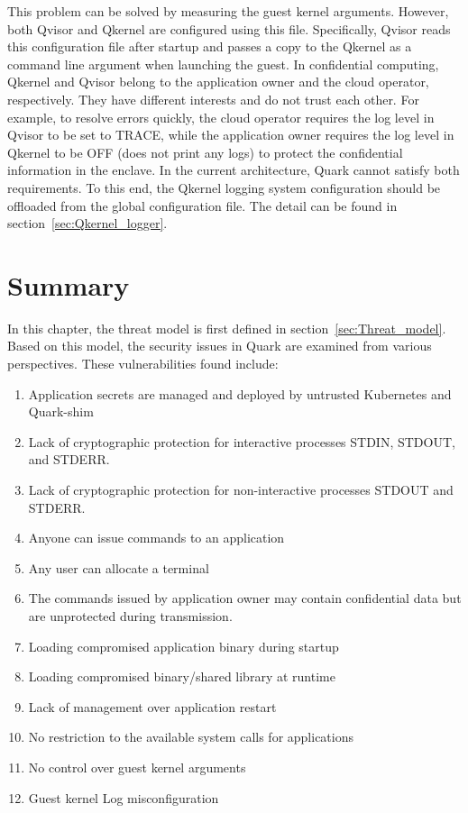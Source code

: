 This problem can be solved by measuring the guest kernel arguments. However, both Qvisor and Qkernel are configured using this file. Specifically, Qvisor reads this configuration file after startup and passes a copy to the Qkernel as a command line argument when launching the guest. In confidential 
computing, Qkernel and Qvisor belong to the application owner and the cloud operator, respectively. They have different interests and do not trust each other. For example, to resolve errors quickly, the cloud operator requires the log level in Qvisor to be set to TRACE, while the application owner 
requires the log level in Qkernel to be OFF (does not print any logs) to protect the confidential information in the enclave. In the current architecture, Quark cannot satisfy both requirements. To this end, the Qkernel logging system configuration should be offloaded from the global configuration 
file. The detail can be found in section~\ref{sec:Qkernel_logger}.




\section{Summary}
In this chapter, the threat model is first defined in section~\ref{sec:Threat_model}. Based on this model, the security issues in Quark are examined from various perspectives. These vulnerabilities found include:
\begin{enumerate}
  \item Application secrets are managed and deployed by untrusted Kubernetes and Quark-shim
  \item Lack of cryptographic protection for interactive processes STDIN, STDOUT, and STDERR.
  \item Lack of cryptographic protection for non-interactive processes STDOUT and STDERR.
  \item Anyone can issue commands to an application
  \item Any user can allocate a terminal
  \item The commands issued by application owner may contain confidential data but are unprotected during transmission.
  \item Loading compromised application binary during startup
  \item Loading compromised binary/shared library at runtime
  \item Lack of management over application restart
  \item No restriction to the available system calls for applications
  \item No control over guest kernel arguments
  \item Guest kernel Log misconfiguration

\end{enumerate}

\cleardoublepage

